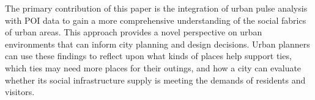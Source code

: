 The primary contribution of this paper is the integration of urban pulse analysis with POI data to gain a more comprehensive understanding of the social fabrics of urban areas. This approach provides a novel perspective on urban environments that can inform city planning and design decisions. Urban planners can use these findings to reflect upon what kinds of places help support ties, which ties may need more places for their outings, and how a city can evaluate whether its social infrastructure supply is meeting the demands of residents and visitors.

